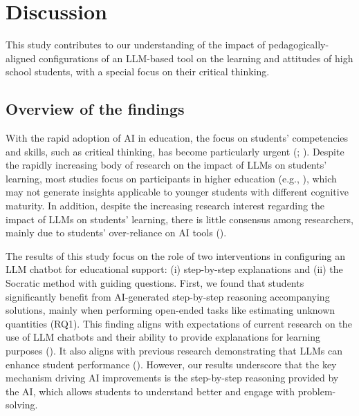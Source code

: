 \documentclass[
  12pt,
]{article}
\begin{document}
\section{Discussion}\label{discussion}

This study contributes to our understanding of the impact of pedagogically-aligned configurations of an LLM-based tool on the learning and attitudes of high school students, with a special focus on their critical thinking.

\subsection{Overview of the findings}\label{overview-of-the-findings}

With the rapid adoption of AI in education, the focus on students' competencies and skills, such as critical thinking, has become particularly urgent (; ). Despite the rapidly increasing body of research on the impact of LLMs on students' learning, most studies focus on participants in higher education (e.g., ), which may not generate insights applicable to younger students with different cognitive maturity. In addition, despite the increasing research interest regarding the impact of LLMs on students' learning, there is little consensus among researchers, mainly due to students' over-reliance on AI tools ().

The results of this study focus on the role of two interventions in configuring an LLM chatbot for educational support: (i) step-by-step explanations and (ii) the Socratic method with guiding questions. First, we found that students significantly benefit from AI-generated step-by-step reasoning accompanying solutions, mainly when performing open-ended tasks like estimating unknown quantities (RQ1). This finding aligns with expectations of current research on the use of LLM chatbots and their ability to provide explanations for learning purposes (). It also aligns with previous research demonstrating that LLMs can enhance student performance (). However, our results underscore that the key mechanism driving AI improvements is the step-by-step reasoning provided by the AI, which allows students to understand better and engage with problem-solving.
\end{document}
